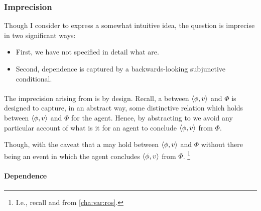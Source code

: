 \subsubsection{Imprecision}

\begin{note}
  Though I consider \qWhyV{} to express a somewhat intuitive idea, the question is imprecise in two significant ways:
  \begin{itemize}[noitemsep]
  \item
    First, we have not specified in detail what \ros{} are.
  \item
    Second, dependence is captured by a backwards-looking subjunctive conditional.
  \end{itemize}
\end{note}

\paragraph{}

\begin{note}
  The imprecision arising from  is by design.
  Recall, a \ros{} between \(\langle \phi, v \rangle\) and \(\Phi\) is designed to capture, in an abstract way, some distinctive relation which holds between \(\langle \phi, v \rangle\) and \(\Phi\) for the agent.
  Hence, by abstracting to  we avoid any particular account of what is it for an agent to conclude \(\langle \phi, v \rangle\) from \(\Phi\).

  Though, with the caveat that a \ros{} may hold between \(\langle \phi, v \rangle\) and \(\Phi\) without there being an event in which the agent concludes \(\langle \phi, v \rangle\) from \(\Phi\).%
  \footnote{
    I.e., recall \supportI{} and \supportII{} from \autoref{cha:var:ros}.
  }
\end{note}

\paragraph{Dependence}

\nocite{Lewis:1973aa}

